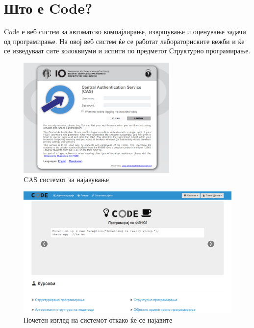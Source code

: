 

\chead{}
\lfoot{}
\cfoot{\thepage}
\rfoot{}
\usepackage{fancyvrb}
\usepackage{xcolor}
\usepackage{textcomp}




\section{Што е Code?}

Code е веб систем за автоматско компајлирање, извршување и оценување задачи
од програмирање. На овој веб систем ќе  се работат лабораториските вежби и ќе се
изведуваат сите колоквиуми и испити по предметот Структурно програмирање.

\begin{figure}[htbp]
\centering
\includegraphics[width=0.7\textwidth]{images/code/cas}
\caption{CAS системот за најавување}
\end{figure}

\begin{figure}[htbp]
\centering
\includegraphics[width=\textwidth]{images/code/main}
\caption{Почетен изглед на системот откако ќе се најавите}
\end{figure}

